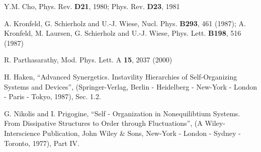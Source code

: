 \documentclass[a4paper,aps,showpacs]{revtex4}
\begin{document}
\begin{thebibliography}{99}
Y.M. Cho, Phys. Rev. \textbf{D21}, 1980; Phys. Rev. 
\textbf{D23}, 1981

A. Kronfeld, G. Schierholz and U.-J. Wiese, Nucl. Phys.
\textbf{B293}, 461 (1987); A. Kronfeld, M. Laursen, G. Schierholz and 
U.-J. Wiese, Phys. Lett. \textbf{B198}, 516 (1987)

 R. Parthasarathy, Mod. Phys. Lett. A \textbf{15}, 2037 (2000)

H. Haken, ``Advanced Synergetics. Instavility Hierarchies of Self-Organizing 
Systems and Devices'', (Springer-Verlag, Berlin - Heidelberg - New-York - 
London - Paris - Tokyo, 1987), Sec. 1.2.

G. Nikolis and I. Prigogine, ``Self - Organization in Nonequilibtium Systems. 
From Dissipative Structures to Order through Fluctuations'', 
(A Wiley-Interscience Publication, John Wiley \& Sons, 
New-York - London - Sydney - Toronto, 1977), Part IV.

\end{thebibliography}
\end{document}

